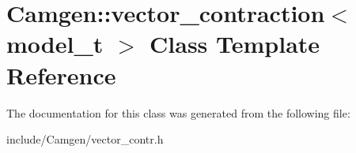 \hypertarget{a00581}{}\section{Camgen\+:\+:vector\+\_\+contraction$<$ model\+\_\+t $>$ Class Template Reference}
\label{a00581}


The documentation for this class was generated from the following file\+:\begin{DoxyCompactItemize}
\item 
include/\+Camgen/vector\+\_\+contr.\+h\end{DoxyCompactItemize}
